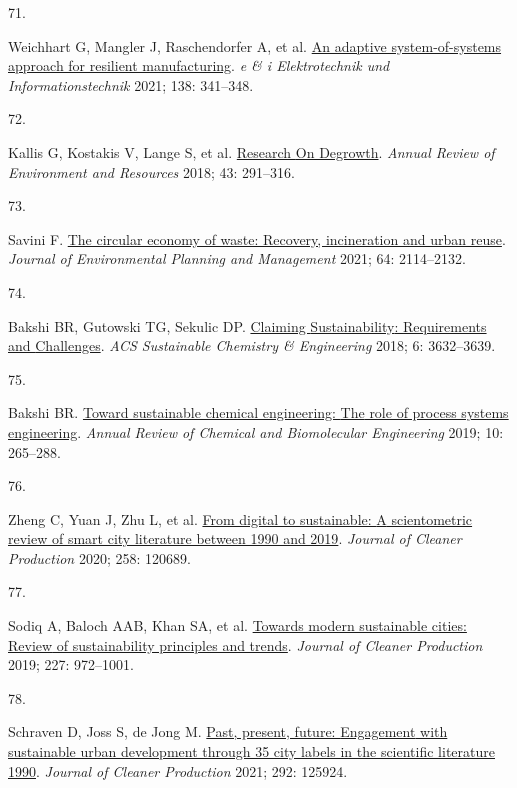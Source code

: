 \documentclass[
  12pt,
  a4paperpaper,
  onecolumn]{article}
\newlength{\cslhangindent}
\newlength{\csllabelwidth}
\newlength{\cslentryspacingunit} %
\newenvironment{CSLReferences}[2] %
 {%
  \setlength{\parindent}{0pt}
  \ifodd #1
  \let\oldpar\par
  \def\par{\hangindent=\cslhangindent\oldpar}
  \fi
  \setlength{\parskip}{#2\cslentryspacingunit}
 }%
 {}
\newcommand{\CSLLeftMargin}[1]{\parbox[t]{\csllabelwidth}{#1}}
\newcommand{\CSLRightInline}[1]{\parbox[t]{\linewidth - \csllabelwidth}{#1}\break}
\begin{document}
\begin{CSLReferences}{0}{0}
\leavevmode{}%
\CSLLeftMargin{71. }%
\CSLRightInline{Weichhart G, Mangler J, Raschendorfer A, et al.
\href{https://doi.org/10.1007/s00502-021-00912-2}{An adaptive
system-of-systems approach for resilient manufacturing}. \emph{e \& i
Elektrotechnik und Informationstechnik} 2021; 138: 341--348.}

\leavevmode{}%
\CSLLeftMargin{72. }%
\CSLRightInline{Kallis G, Kostakis V, Lange S, et al.
\href{https://doi.org/10.1146/annurev-environ-102017-025941}{Research
{On Degrowth}}. \emph{Annual Review of Environment and Resources} 2018;
43: 291--316.}

\leavevmode{}%
\CSLLeftMargin{73. }%
\CSLRightInline{Savini F.
\href{https://doi.org/10.1080/09640568.2020.1857226}{The circular
economy of waste: Recovery, incineration and urban reuse}. \emph{Journal
of Environmental Planning and Management} 2021; 64: 2114--2132.}

\leavevmode{}%
\CSLLeftMargin{74. }%
\CSLRightInline{Bakshi BR, Gutowski TG, Sekulic DP.
\href{https://doi.org/10.1021/acssuschemeng.7b03953}{Claiming
{Sustainability}: {Requirements} and {Challenges}}. \emph{ACS
Sustainable Chemistry \& Engineering} 2018; 6: 3632--3639.}

\leavevmode{}%
\CSLLeftMargin{75. }%
\CSLRightInline{Bakshi BR.
\href{https://doi.org/10.1146/annurev-chembioeng-060718-030332}{Toward
sustainable chemical engineering: {The} role of process systems
engineering}. \emph{Annual Review of Chemical and Biomolecular
Engineering} 2019; 10: 265--288.}

\leavevmode{}%
\CSLLeftMargin{76. }%
\CSLRightInline{Zheng C, Yuan J, Zhu L, et al.
\href{https://doi.org/10.1016/j.jclepro.2020.120689}{From digital to
sustainable: {A} scientometric review of smart city literature between
1990 and 2019}. \emph{Journal of Cleaner Production} 2020; 258: 120689.}

\leavevmode{}%
\CSLLeftMargin{77. }%
\CSLRightInline{Sodiq A, Baloch AAB, Khan SA, et al.
\href{https://doi.org/10.1016/j.jclepro.2019.04.106}{Towards modern
sustainable cities: {Review} of sustainability principles and trends}.
\emph{Journal of Cleaner Production} 2019; 227: 972--1001.}

\leavevmode{}%
\CSLLeftMargin{78. }%
\CSLRightInline{Schraven D, Joss S, de Jong M.
\href{https://doi.org/10.1016/j.jclepro.2021.125924}{Past, present,
future: {Engagement} with sustainable urban development through 35 city
labels in the scientific literature 1990\textendash 2019}. \emph{Journal
of Cleaner Production} 2021; 292: 125924.}


\end{CSLReferences}
\end{document}
